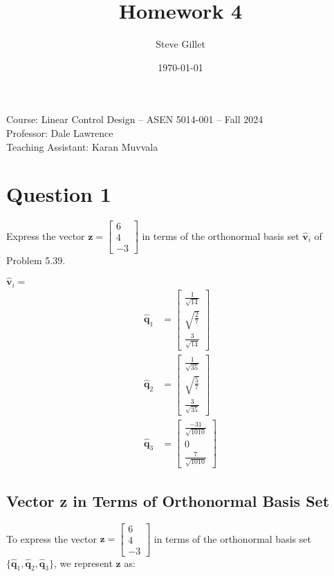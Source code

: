 \documentclass{article}
\title{Homework 4}
\author{Steve Gillet}
\date{\today}
\newcommand{\className}{Course: Linear Control Design – ASEN 5014-001 – Fall 2024}
\newcommand{\professorName}{Professor: Dale Lawrence}
\newcommand{\taName}{Teaching Assistant: Karan Muvvala}
\begin{document}
\maketitle
\begin{center}
    \large{\className} \\
    \large{\professorName} \\
    \large{\taName}
\end{center}

\section{Question 1}
Express the vector $\mathbf{z}=\begin{bmatrix} 6 \\ 4 \\ -3 \end{bmatrix}$ in terms of the orthonormal basis set $\mathbf{\hat{v}}_i$ of Problem 5.39.

$\mathbf{\hat{v}}_i=$
\begin{align*}
    \mathbf{\hat{q}}_1 &= \begin{bmatrix} \frac{1}{\sqrt{14}} \\ \sqrt{\frac{2}{7}} \\ \frac{3}{\sqrt{14}} \end{bmatrix}\\
    \mathbf{\hat{q}}_2 &= \begin{bmatrix} \frac{1}{\sqrt{35}} \\ \sqrt{\frac{5}{7}} \\ \frac{3}{\sqrt{35}} \end{bmatrix} \\
    \mathbf{\hat{q}}_3 &= \begin{bmatrix} \frac{-31}{\sqrt{1010}} \\ 0 \\ \frac{7}{\sqrt{1010}} \end{bmatrix}
\end{align*}

\subsection{Vector z in Terms of Orthonormal Basis Set}

To express the vector \(\mathbf{z} = \begin{bmatrix} 6 \\ 4 \\ -3 \end{bmatrix}\) in terms of the orthonormal basis set \(\{ \hat{\mathbf{q}}_1, \hat{\mathbf{q}}_2, \hat{\mathbf{q}}_3 \}\), we represent \(\mathbf{z}\) as:
\end{document}
